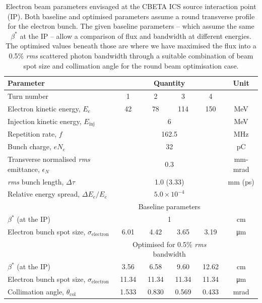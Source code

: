 \documentclass[../main.tex]{subfiles}
\begin{document}
\begin{table}[!h]
\caption{Electron beam parameters envisaged at the CBETA ICS source interaction point (IP). Both baseline and optimised parameters assume a round transverse profile for the electron bunch. The given baseline parameters -- which assume the same $\beta^*$ at the IP -- allow a comparison of flux and bandwidth at different energies. The optimised values beneath those are where we have maximised the flux into a 0.5\% \textit{rms} scattered photon bandwidth through a suitable combination of beam spot size and collimation angle for the round beam optimisation case. }
\vspace{3mm}
\begin{tabular}{lccccc}
\hline\hline
Parameter & \multicolumn{4}{c}{Quantity} & Unit \\
\hline
Turn number & 1 & 2 & 3 & 4 & \\
Electron kinetic energy, $E_e$ & 42 & 78 & 114 & 150 & \si{\mega\electronvolt}\\
Injection kinetic energy, $E_{\mathrm{inj}}$ & \multicolumn{4}{c}{6} & \si{\mega\electronvolt} \\
Repetition rate, $f$ & \multicolumn{4}{c}{162.5} & \si{\mega\hertz}\\
Bunch charge, $e N_e$ & \multicolumn{4}{c}{32} & \si{\pico\coulomb} \\
Transverse normalised \textit{rms} emittance, $\epsilon_{N}$ & \multicolumn{4}{c}{0.3} & \si{\milli\meter}-\si{\milli\radian}\\
\textit{rms} bunch length, $\Delta \tau$ & \multicolumn{4}{c}{1.0 (3.33)} & \si{\milli\meter} (\si{\pico\second})\\
Relative energy spread, $\Delta E_{e}/E_{e}$ & \multicolumn{4}{c}{$5.0\times 10^{-4}$} & \\
\hline
 & \multicolumn{4}{c}{Baseline parameters} & \\
\hline
$\beta^*$ (at the IP) & \multicolumn{4}{c}{1} & \si{\centi\meter}\\
Electron bunch spot size, $\sigma_{\mathrm{electron}}$ & 6.01 & 4.42 & 3.65 & 3.19  & \si{\micro\meter} \\
\hline
 & \multicolumn{4}{c}{Optimised for 0.5\% \textit{rms} bandwidth} & \\
\hline
$\beta^*$ (at the IP) & 3.56 & 6.58 & 9.60 & 12.62 & \si{\centi\meter}\\
Electron bunch spot size, $\sigma_{\mathrm{electron}}$ & 11.34 & 11.34 & 11.34 & 11.34  & \si{\micro\meter}\\
Collimation angle, $\theta_{\mathrm{col}}$ & 1.533 & 0.830 & 0.569 & 0.433 & \si{\milli\radian}\\
\hline\hline
\end{tabular}
\label{tab:CBETA_electron_beam_design_parameters}
\end{table}
\end{document}

